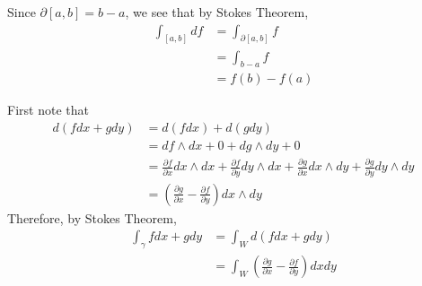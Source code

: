 \documentclass[12pt,class=article,crop=false]{standalone}
\begin{document}
\begin{problem}[4.7.1]
	Since $ \partial [a,b] = b -a$, we see that by Stokes Theorem,
\begin{align*}
	\int_{[a,b]} df &= \int_{ \partial [a,b]} f \\
	&= \int_{b-a} f \\
	&= f(b) - f(a) 
\end{align*}
\end{problem}
\begin{problem}[4.7.2]
First note that
\begin{align*}
	d(fdx+gdy) &= d(fdx) + d(gdy) \\
	&= df \wedge dx +0 + dg \wedge dy+0 \\
	&= \frac{\partial f}{\partial x} dx \wedge dx + \frac{\partial f}{\partial y} dy \wedge dx + \frac{\partial g}{\partial x} dx \wedge dy + \frac{\partial g}{\partial y} dy \wedge dy\\
	&= \left( \frac{\partial g}{\partial x} - \frac{\partial f}{\partial y}  \right) dx \wedge dy 
\end{align*}
Therefore, by Stokes Theorem,
\begin{align*}
	\int_{ \gamma} fdx + gdy &= \int_{W} d(fdx + gdy) \\
	&= \int_W \left( \frac{\partial g}{\partial x} - \frac{\partial f}{\partial y}  \right) dx dy 
\end{align*}
\end{problem}
\end{document}
